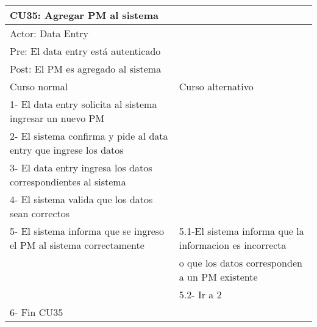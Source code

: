 \begin{table}[H]
  \begin{adjustbox}{max width = \textwidth}
  \begin{tabular}{|l|l|}
    \hline
    \multicolumn{2}{|l|}{CU35: Agregar PM al sistema} \\\hline
    \multicolumn{2}{|l|}{Actor: Data Entry} \\\hline
    \multicolumn{2}{|l|}{Pre: El data entry está autenticado} \\\hline
    \multicolumn{2}{|l|}{Post: El PM es agregado al sistema} \\\hline
     Curso normal & Curso alternativo\\ \hline
	 1- El data entry solicita al sistema ingresar un nuevo PM & \\ \hline
     2- El sistema confirma y pide al data entry que ingrese los datos & \\ \hline
     3- El data entry ingresa los datos correspondientes al sistema & \\ \hline
     4- El sistema valida que los datos sean correctos & \\ \hline
     5- El sistema informa que se ingreso el PM al sistema correctamente & 5.1-El sistema informa que la informacion es incorrecta \\ & o que los datos corresponden a un PM existente  \\ & 5.2- Ir a 2 \\ \hline
     6- Fin CU35 & \\ \hline
  \end{tabular}
  \end{adjustbox}
\end{table}


